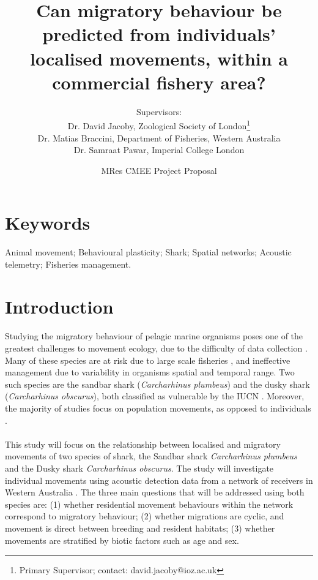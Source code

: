 \documentclass[11pt,a4paper,titlepage]{article}
\title{Can migratory behaviour be predicted from individuals' localised movements, within a commercial fishery area?}
\date{MRes CMEE Project Proposal}
\author{Supervisors:\\Dr. David Jacoby, Zoological Society of London\thanks{Primary Supervisor; contact: david.jacoby@ioz.ac.uk}\\Dr. Matias Braccini, Department of Fisheries, Western Australia\\Dr. Samraat Pawar, Imperial College London}
\begin{document}
	
	\maketitle
	
	\newpage
	\linenumbers	
	\section{Keywords}
	 
	Animal movement; Behavioural plasticity; Shark; Spatial networks; Acoustic telemetry; Fisheries management.
	
	\section{Introduction}
	
	\paragraph{}Studying the migratory behaviour of pelagic marine organisms poses one of the greatest challenges to movement ecology, due to the difficulty of data collection \cite{Jacoby2016}. Many of these species are at risk due to large scale fisheries \cite{Braccini2017,Braccini2018}, and ineffective management due to variability in organisms spatial and temporal range. Two such species are the sandbar shark (\textit{Carcharhinus plumbeus}) and the dusky shark (\textit{Carcharhinus obscurus}), both classified as vulnerable by the IUCN \cite{Musick2009,Musick2009a}. Moreover, the majority of studies focus on population movements, as opposed to individuals \cite{Jacoby2012}.
	
	\paragraph{}This study will focus on the relationship between localised and migratory movements of two species of shark, the Sandbar shark \textit{Carcharhinus plumbeus} and the Dusky shark \textit{Carcharhinus obscurus}. The study will investigate individual movements using acoustic detection data from a network of receivers in Western Australia . The three main questions that will be addressed using both species are: (1) whether residential movement behaviours within the network correspond to migratory behaviour; (2) whether migrations are cyclic, and movement is direct between breeding and resident habitats; (3) whether movements are stratified by biotic factors such as age and sex.
	
\end{document}
